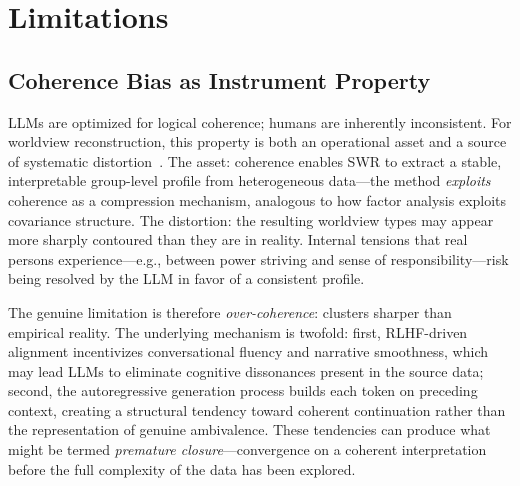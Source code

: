 \documentclass[11pt,a4paper]{article}
\begin{document}
\section{Limitations}
\label{sec:limitations}

\subsection{Coherence Bias as Instrument Property}
\label{sec:limitations:coherence}

LLMs are optimized for logical coherence; humans are inherently inconsistent. For worldview reconstruction, this property is both an operational asset and a source of systematic distortion~\citep{Geiger2026PaperA}. The asset: coherence enables SWR to extract a stable, interpretable group-level profile from heterogeneous data---the method \emph{exploits} coherence as a compression mechanism, analogous to how factor analysis exploits covariance structure. The distortion: the resulting worldview types may appear more sharply contoured than they are in reality. Internal tensions that real persons experience---e.g., between power striving and sense of responsibility---risk being resolved by the LLM in favor of a consistent profile.

The genuine limitation is therefore \emph{over-coherence}: clusters sharper than empirical reality. The underlying mechanism is twofold: first, RLHF-driven alignment incentivizes conversational fluency and narrative smoothness, which may lead LLMs to eliminate cognitive dissonances present in the source data; second, the autoregressive generation process builds each token on preceding context, creating a structural tendency toward coherent continuation rather than the representation of genuine ambivalence. These tendencies can produce what might be termed \emph{premature closure}---convergence on a coherent interpretation before the full complexity of the data has been explored.
\end{document}
